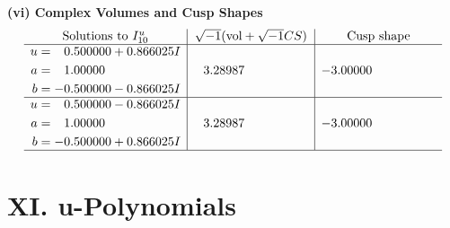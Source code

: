 \documentclass[1p]{elsarticle_modified}
\theoremstyle{definition}
\newcommand{\I}{\sqrt{-1}}
\begin{document}
\newpage\flushleft \textbf{(vi) Complex Volumes and Cusp Shapes}
$$\begin{array}{c|c|c}  
\text{Solutions to }I^u_{10}& \I (\text{vol} + \sqrt{-1}CS) & \text{Cusp shape}\\
 \hline 
\begin{aligned}
u &= \phantom{-}0.500000 + 0.866025 I \\
a &= \phantom{-}1.00000\phantom{ +0.000000I} \\
b &= -0.500000 - 0.866025 I\end{aligned}
 & \phantom{-}3.28987\phantom{ +0.000000I} & -3.00000\phantom{ +0.000000I} \\ \hline\begin{aligned}
u &= \phantom{-}0.500000 - 0.866025 I \\
a &= \phantom{-}1.00000\phantom{ +0.000000I} \\
b &= -0.500000 + 0.866025 I\end{aligned}
 & \phantom{-}3.28987\phantom{ +0.000000I} & -3.00000\phantom{ +0.000000I}\\
 \hline 
 \end{array}$$\newpage
\newpage\renewcommand{\arraystretch}{1}
\centering \section*{ XI. u-Polynomials}
\end{document}
